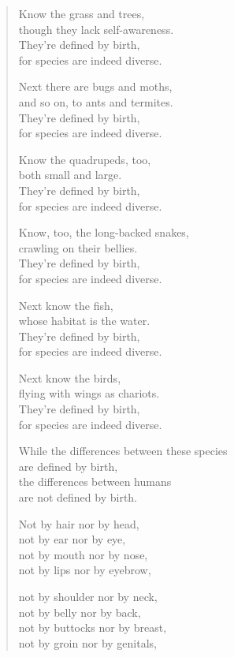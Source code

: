 \documentclass[12pt,openany]{book}%
\begin{document}
\begin{verse}
Know the grass and trees, \\
though they lack self-awareness. \\
They’re defined by birth, \\
for species are indeed diverse. 

Next there are bugs and moths, \\
and so on, to ants and termites. \\
They’re defined by birth, \\
for species are indeed diverse. 

Know the quadrupeds, too, \\
both small and large. \\
They’re defined by birth, \\
for species are indeed diverse. 

Know, too, the long-backed snakes, \\
crawling on their bellies. \\
They’re defined by birth, \\
for species are indeed diverse. 

Next know the fish, \\
whose habitat is the water. \\
They’re defined by birth, \\
for species are indeed diverse. 

Next know the birds, \\
flying with wings as chariots. \\
They’re defined by birth, \\
for species are indeed diverse. 

While the differences between these species \\
are defined by birth, \\
the differences between humans \\
are not defined by birth. 

Not by hair nor by head, \\
not by ear nor by eye, \\
not by mouth nor by nose, \\
not by lips nor by eyebrow, 

not by shoulder nor by neck, \\
not by belly nor by back, \\
not by buttocks nor by breast, \\
not by groin nor by genitals, 


\end{verse}
\end{document}
